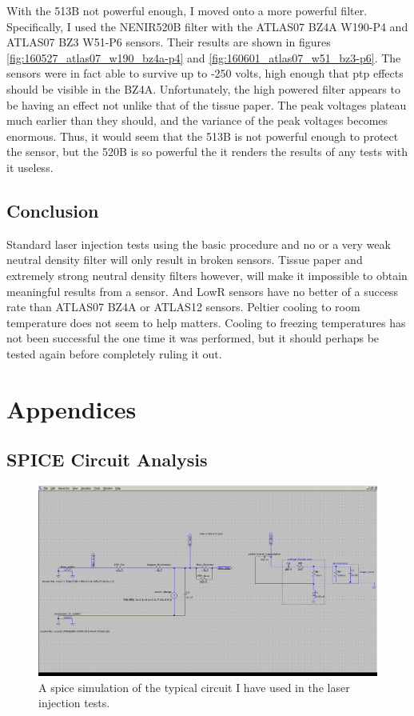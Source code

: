 \documentclass{report}
\begin{document}
            With the 513B not powerful enough, I moved onto a more powerful filter. Specifically, I used the NENIR520B filter with the ATLAS07 BZ4A W190-P4 and ATLAS07 BZ3 W51-P6 sensors. Their results are shown in figures \ref{fig:160527_atlas07_w190_bz4a-p4} and \ref{fig:160601_atlas07_w51_bz3-p6}. The sensors were in fact able to survive up to -250 volts, high enough that ptp effects should be visible in the BZ4A. Unfortunately, the high powered filter appears to be having an effect not unlike that of the tissue paper. The peak voltages plateau much earlier than they should, and the variance of the peak voltages becomes enormous. Thus, it would seem that the 513B is not powerful enough to protect the sensor, but the 520B is so powerful the it renders the results of any tests with it useless.



        \section{Conclusion}
            Standard laser injection tests using the basic procedure and no or a very weak neutral density filter will only result in broken sensors. Tissue paper and extremely strong neutral density filters however, will make it impossible to obtain meaningful results from a sensor. And LowR sensors have no better of a success rate than ATLAS07 BZ4A or ATLAS12 sensors. Peltier cooling to room temperature does not seem to help matters. Cooling to freezing temperatures has not been successful the one time it was performed, but it should perhaps be tested again before completely ruling it out.
            





    \chapter{Appendices}
        \section{SPICE Circuit Analysis}

            \begin{figure}[h] 
                \includegraphics[height=.4\textheight]{spice_circuit}
                \centering
                \caption{ A spice simulation of the typical circuit I have used in the laser injection tests. }
                \label{fig:spice_circuit}
            \end{figure}
\end{document}
